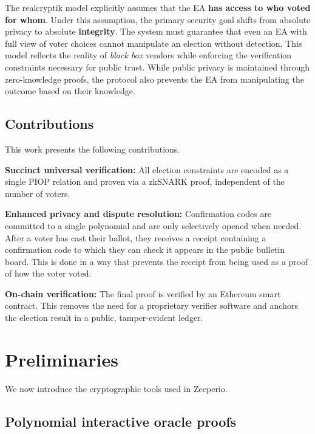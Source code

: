 The realcryptik model explicitly assumes that the EA \textbf{has access to who voted for whom}. Under this assumption, the primary security goal shifts from absolute privacy to absolute \textbf{integrity}. 
The system must guarantee that even an EA with full view of voter choices cannot manipulate an election without detection. This model reflects the reality of \emph{black box} vendors while enforcing the verification constraints necessary for public trust. 
While public privacy is maintained through zero-knowledge proofs, the protocol also prevents the EA from manipulating the outcome based on their knowledge.

\subsection{Contributions}
This work presents the following contributions.

\begin{description} 
\item \textbf{Succinct universal verification:} All election constraints are encoded as a single PIOP relation and proven via a zkSNARK proof, independent of the number of voters.
\item \textbf{Enhanced privacy and dispute resolution:}
  Confirmation codes are committed to a single polynomial and are only selectively opened when needed.
  After a voter has cast their ballot, they receives a receipt containing a confirmation code to which they can check it appears in the public bulletin board. 
 This is done in a way that prevents the receipt from being used as a proof of how the voter voted.
  \item \textbf{On-chain verification:}
  The final proof is verified by an Ethereum smart contract. This removes the need for a proprietary verifier software and anchors the election result in a public, tamper-evident ledger.
\end{description}




\section{Preliminaries}

We now introduce the cryptographic tools used in Zeeperio.

\subsection{Polynomial interactive oracle proofs}

